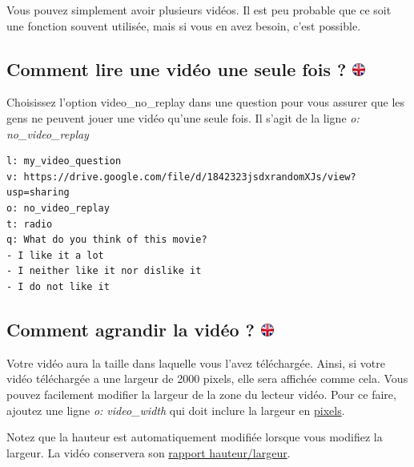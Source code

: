 \documentclass[
]{book}
\begin{document}
Vous pouvez simplement avoir plusieurs vidéos. Il est peu probable que ce soit une fonction souvent utilisée, mais si vous en avez besoin, c'est possible.

\hypertarget{comment-lire-une-viduxe9o-une-seule-fois}{%
\subsection[Comment lire une vidéo une seule fois ? ]{\texorpdfstring{Comment lire une vidéo une seule fois ? \href{https://www.psytoolkit.org/lessons/surveyaudiovideo.html\#_how_to_play_a_video_only_one_time}{\protect\includegraphics{img/ukflag.png}}}{Comment lire une vidéo une seule fois ? }}\label{comment-lire-une-viduxe9o-une-seule-fois}}

Choisissez l'option video\_no\_replay dans une question pour vous assurer que les gens ne peuvent jouer une vidéo qu'une seule fois. Il s'agit de la ligne \emph{o: no\_video\_replay}

\begin{verbatim}
l: my_video_question
v: https://drive.google.com/file/d/1842323jsdxrandomXJs/view?usp=sharing
o: no_video_replay
t: radio
q: What do you think of this movie?
- I like it a lot
- I neither like it nor dislike it
- I do not like it
\end{verbatim}

\hypertarget{comment-agrandir-la-viduxe9o}{%
\subsection[Comment agrandir la vidéo ? ]{\texorpdfstring{Comment agrandir la vidéo ? \href{https://www.psytoolkit.org/lessons/surveyaudiovideo.html\#_how_to_make_the_video_larger}{\protect\includegraphics{img/ukflag.png}}}{Comment agrandir la vidéo ? }}\label{comment-agrandir-la-viduxe9o}}

Votre vidéo aura la taille dans laquelle vous l'avez téléchargée. Ainsi, si votre vidéo téléchargée a une largeur de 2000 pixels, elle sera affichée comme cela. Vous pouvez facilement modifier la largeur de la zone du lecteur vidéo. Pour ce faire, ajoutez une ligne \emph{o: video\_width} qui doit inclure la largeur en \href{https://fr.wikipedia.org/wiki/Pixel}{pixels}.

Notez que la hauteur est automatiquement modifiée lorsque vous modifiez la largeur. La vidéo conservera son \href{https://fr.wikipedia.org/wiki/Aspect_ratio}{rapport hauteur/largeur}.
\end{document}
